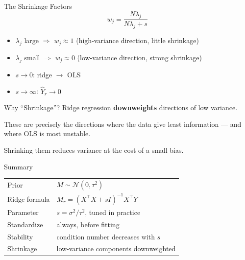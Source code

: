 \documentclass{beamer}
\begin{document}
\begin{frame}{The Shrinkage Factors}
\[
  w_j = \frac{N\lambda_j}{N\lambda_j + s}
\]

\bigskip
\begin{itemize}
  \item $\lambda_j$ large \; $\Rightarrow$ \; $w_j \approx 1$ \quad (high-variance direction, little shrinkage)
  \item $\lambda_j$ small \; $\Rightarrow$ \; $w_j \approx 0$ \quad (low-variance direction, strong shrinkage)
\end{itemize}

\bigskip
\begin{itemize}
  \item $s \to 0$: ridge $\to$ OLS
  \item $s \to \infty$: $\hat{Y}_r \to 0$
\end{itemize}
\end{frame}

\begin{frame}{Why ``Shrinkage''?}
Ridge regression \textbf{downweights} directions of low variance.

\bigskip
These are precisely the directions where the data give least information — and where OLS is most unstable.

\bigskip
Shrinking them reduces variance at the cost of a small bias.
\end{frame}

\begin{frame}{Summary}
\begin{tabular}{@{}ll@{}}
  Prior & $M\sim\mathcal{N}(0,\tau^2)$ \\[8pt]
  Ridge formula & $M_r = (X^\intercal X + sI)^{-1}X^\intercal Y$ \\[8pt]
  Parameter & $s = \sigma^2/\tau^2$, tuned in practice \\[8pt]
  Standardize & always, before fitting \\[8pt]
  Stability & condition number decreases with $s$ \\[8pt]
  Shrinkage & low-variance components downweighted
\end{tabular}
\end{frame}
\end{document}
